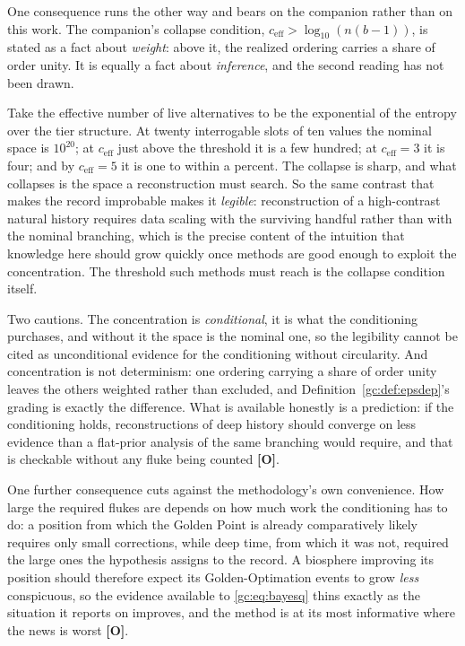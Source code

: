 \begin{remark}
\label{gc:rem:legibility}
One consequence runs the other way and bears on the companion rather than
on this work. The companion's collapse condition,
$c_{\mathrm{eff}}>\log_{10}(n(b-1))$, is stated as a fact about
\emph{weight}: above it, the realized ordering carries a share of order
unity. It is equally a fact about \emph{inference}, and the second
reading has not been drawn.

Take the effective number of live alternatives to be the exponential of
the entropy over the tier structure. At twenty interrogable slots of ten
values the nominal space is $10^{20}$; at $c_{\mathrm{eff}}$ just above
the threshold it is a few hundred; at $c_{\mathrm{eff}}=3$ it is four;
and by $c_{\mathrm{eff}}=5$ it is one to within a percent. The collapse
is sharp, and what collapses is the space a reconstruction must search.
So the same contrast that makes the record improbable makes it
\emph{legible}: reconstruction of a high-contrast natural history
requires data scaling with the surviving handful rather than with the
nominal branching, which is the precise content of the intuition that
knowledge here should grow quickly once methods are good enough to
exploit the concentration. The threshold such methods must reach is the
collapse condition itself.

Two cautions. The concentration is \emph{conditional}, it is what the
conditioning purchases, and without it the space is the nominal one, so the legibility cannot be cited as unconditional evidence for the
conditioning without circularity. And concentration is not determinism:
one ordering carrying a share of order unity leaves the others weighted
rather than excluded, and Definition~\ref{gc:def:epsdep}'s grading is exactly the
difference. What is available honestly is a prediction: if the
conditioning holds, reconstructions of deep history should converge on
less evidence than a flat-prior analysis of the same branching would
require, and that is checkable without any fluke being counted
\textbf{[O]}.
\end{remark}

One further consequence cuts against the methodology's own convenience.
How large the required flukes are depends on how much work the
conditioning has to do: a position from which the Golden Point is already comparatively
likely requires only small corrections, while deep time, from which it
was not, required the large ones the hypothesis assigns to the record. A biosphere
improving its position should therefore expect its Golden-Optimation
events to grow \emph{less} conspicuous, so the evidence available to
\eqref{gc:eq:bayesq} thins exactly as the situation it reports on
improves, and the method is at its most informative where the news is
worst \textbf{[O]}.

